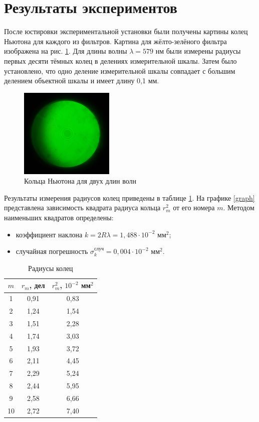 \documentclass[a4paper,12pt]{article} %
\begin{document}
\section{Результаты экспериментов}

После юстировки экспериментальной установки были получены картины колец Ньютона
для каждого из фильтров. Картина для жёлто-зелёного фильтра изображена на рис. \ref{ringImage}. Для длины волны $\lambda = 579$ нм были измерены радиусы первых десяти тёмных колец в делениях измерительной шкалы. Затем было установлено, что одно деление измерительной шкалы совпадает с большим делением объектной шкалы и имеет длину 0,1 мм. 
\begin{figure}[h]
    \centering
    \includegraphics[width=0.4\textwidth]{rings.jpg}
    \caption{Кольца Ньютона для двух длин волн}
    \label{ringImage}
\end{figure}

Результаты измерения радиусов колец приведены в таблице \ref{radii}. На графике \ref{graph} представлена зависимость квадрата радиуса кольца $r_m^2$ от его номера $m$. Методом наименьших квадратов определены:
\begin{itemize}
    \item коэффициент наклона $k = 2R\lambda = 1,488\cdot 10^{-2}$ мм$^2$;
    \item случайная погрешность $\sigma_k^\text{случ} = 0,004\cdot 10^{-2}$ мм$^2$.
\end{itemize}
\begin{table}[h]
    \centering
    \begin{tabular}{|c|c|c|} \hline
        $m$ & $r_m$, дел & $r_m^2$, $10^{-2}$ мм$^2$ \\ \hline
        1 & 0,91 & 0,83 \\ \hline
        2 & 1,24 & 1,54 \\ \hline
        3 & 1,51 & 2,28 \\ \hline
        4 & 1,74 & 3,03 \\ \hline
        5 & 1,93 & 3,72 \\ \hline
        6 & 2,11 & 4,45 \\ \hline
        7 & 2,29 & 5,24 \\ \hline
        8 & 2,44 & 5,95 \\ \hline
        9 & 2,58 & 6,66 \\ \hline
        10& 2,72 & 7,40 \\ \hline
    \end{tabular}
    \caption{Радиусы колец}
    \label{radii}
\end{table}
\end{document}
